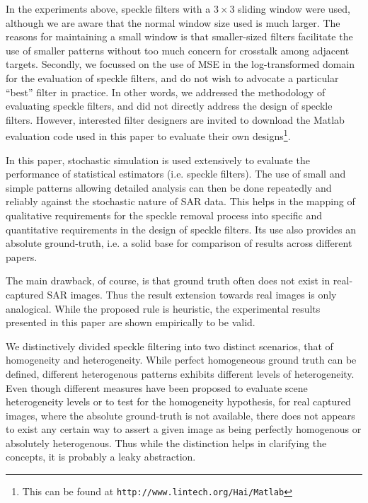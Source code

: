 \documentclass[journal]{IEEEtran}
\begin{document}
In the experiments above, speckle filters with a $3 \times 3$ sliding window were used, 
	although we are aware that the normal window size used is much larger. 
The reasons for maintaining a small window is that 
	smaller-sized filters facilitate the use of smaller patterns without too much concern for crosstalk among adjacent targets.
Secondly, we focussed on the use of MSE in the log-transformed domain for the evaluation of speckle filters, 
	and do not wish to advocate a particular ``best'' filter in practice. 
In other words, we addressed the methodology of evaluating speckle filters, 
	and did not directly address the design of speckle filters.
However, interested filter designers are invited to download the Matlab evaluation code used in this paper to evaluate their own designs\footnote{This can be found at \texttt{http://www.lintech.org/Hai/Matlab}}.

In this paper, stochastic simulation is used extensively to evaluate the performance of statistical estimators (i.e. speckle filters).
The use of small and simple patterns allowing detailed analysis can then be done repeatedly and reliably against the stochastic nature of SAR data.%
This helps in the mapping of qualitative requirements for the speckle removal process into specific and quantitative requirements in the design of speckle filters.
Its use also provides an absolute ground-truth, i.e. a solid base for comparison of results across different papers.

The main drawback, of course, is that ground truth often does not exist in real-captured SAR images.%
Thus the result extension towards real images is only analogical.
While the proposed rule is heuristic, 
	the experimental results presented in this paper are shown empirically to be valid.

We distinctively divided speckle filtering into two distinct scenarios, that of homogeneity and heterogeneity.
While perfect homogeneous ground truth can be defined, 
	different heterogenous patterns exhibits different levels of heterogeneity. 
Even though different measures have been proposed to evaluate scene heterogeneity levels or to test for the homogeneity hypothesis, 
	for real captured images, where the absolute ground-truth is not available, 
	there does not appears to exist any certain way to assert a given image as being perfectly homogenous or absolutely heterogenous.
Thus while the distinction helps in clarifying the concepts, 
	it is probably a leaky abstraction.
\end{document}
